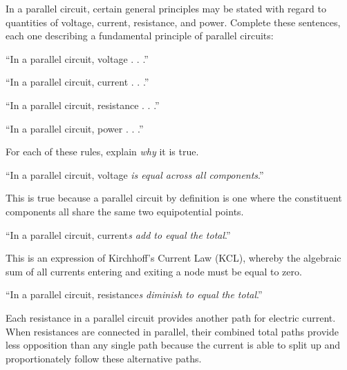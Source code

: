 

In a parallel circuit, certain general principles may be stated with regard to quantities of voltage, current, resistance, and power.  Complete these sentences, each one describing a fundamental principle of parallel circuits:

\vskip 10pt

\noindent
``In a parallel circuit, voltage . . .''

\vskip 10pt

\noindent
``In a parallel circuit, current . . .''

\vskip 10pt

\noindent
``In a parallel circuit, resistance . . .''

\vskip 10pt

\noindent
``In a parallel circuit, power . . .''

\vskip 10pt

For each of these rules, explain {\it why} it is true.







\noindent
``In a parallel circuit, voltage {\it is equal across all components}.''

\vskip 10pt

This is true because a parallel circuit by definition is one where the constituent components all share the same two equipotential points.




\vskip 30pt

\noindent
``In a parallel circuit, current{\it s add to equal the total}.''

\vskip 10pt

This is an expression of Kirchhoff's Current Law (KCL), whereby the algebraic sum of all currents entering and exiting a node must be equal to zero.



\vskip 30pt

\noindent
``In a parallel circuit, resistance{\it s diminish to equal the total}.''

\vskip 10pt

Each resistance in a parallel circuit provides another path for electric current.  When resistances are connected in parallel, their combined total paths provide less opposition than any single path because the current is able to split up and proportionately follow these alternative paths.



